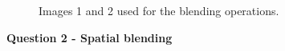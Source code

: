 \documentclass[12pt,a4paper]{article}
\begin{document}
\begin{figure}[!h]
	\centering
	\quad
	\caption{Images 1 and 2 used for the blending operations.}
	\label{fig:blending}
\end{figure}

\textbf{\LARGE Question 2 - Spatial blending}\\
\end{document}
